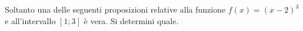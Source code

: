Soltanto una delle seguenti proposizioni relative alla funzione $f(x)=(x-2)^3$ 
e all’intervallo $[1; 3]$ è vera.
Si determini quale.
